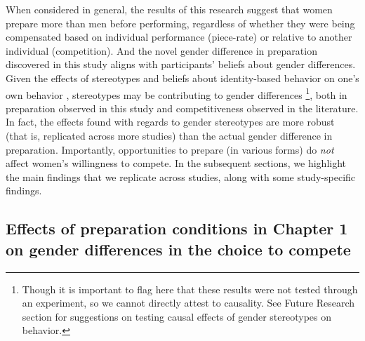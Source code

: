 \documentclass[letterpaper, nobind]{templates/ociamthesis}
\begin{document}
When considered in general, the results of this research suggest that women prepare more than men before performing, regardless of whether they were being compensated based on individual performance (piece-rate) or relative to another individual (competition). And the novel gender difference in preparation discovered in this study aligns with participants' beliefs about gender differences. Given the effects of stereotypes and beliefs about identity-based behavior on one's own behavior \autocite{Bordalo2019,Miller2016,Ellemers2018,Akerlof2000,Benjamin2010c}, stereotypes may be contributing to gender differences \footnote{Though it is important to flag here that these results were not tested through an experiment, so we cannot directly attest to causality. See Future Research section for suggestions on testing causal effects of gender stereotypes on behavior.}, both in preparation observed in this study and competitiveness observed in the literature. In fact, the effects found with regards to gender stereotypes are more robust (that is, replicated across more studies) than the actual gender difference in preparation. Importantly, opportunities to prepare (in various forms) do \emph{not} affect women's willingness to compete. In the subsequent sections, we highlight the main findings that we replicate across studies, along with some study-specific findings.

\hypertarget{effects-of-preparation-conditions-in-chapter-1-on-gender-differences-in-the-choice-to-compete}{%
\subsection{Effects of preparation conditions in Chapter 1 on gender differences in the choice to compete}\label{effects-of-preparation-conditions-in-chapter-1-on-gender-differences-in-the-choice-to-compete}}
\end{document}
